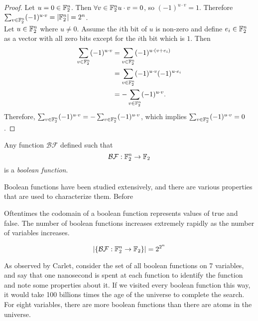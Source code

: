 \begin{proof}
	Let $u=0\in\mathbb{F}_2^n$. Then $\forall v\in\mathbb{F}_2^n u\cdot v=0$, so
	$(-1)^{u\cdot v}=1$. Therefore $\sum_{v\in\mathbb{F}_2^n}(-1)^{u\cdot v}=\lvert\mathbb{F}_2^n\rvert=2^n$. \\

	Let $u\in\mathbb{F}_2^n$ where $u\not=0$. Assume the $i$th bit of $u$ is non-zero and
	define $e_i\in\mathbb{F}_2^n$ as a vector with all zero bits except for the $i$th bit which is $1$. Then
	\begin{align*}
		\sum_{v\in\mathbb{F}_2^n}(-1)^{u\cdot v} &= \sum_{v\in\mathbb{F}_2^n}(-1)^{u\cdot (v+e_i)} \\
		                                   &= \sum_{v\in\mathbb{F}_2^n}(-1)^{u\cdot v}(-1)^{u\cdot e_i} \\
																			 &= -\sum_{v\in\mathbb{F}_2^n}(-1)^{u\cdot v}.
  \end{align*}
	Therefore, $\sum_{v\in\mathbb{F}_2^n}(-1)^{u\cdot v}=-\sum_{v\in\mathbb{F}_2^n}(-1)^{u\cdot v}$, which implies
	$\sum_{v\in\mathbb{F}_2^n}(-1)^{u\cdot v}=0$.
\end{proof}

\begin{definition}
\label{def:boolean-function}
  Any function $\mathcal{BF}$ defined such that 
  \begin{equation}
    \mathcal{BF}:\mathbb{F}_2^n\rightarrow\mathbb{F}_2
  \end{equation}
  is a {\em boolean function}.
\end{definition}

\par Boolean functions have been studied extensively, and there are various properties that
are used to characterize them. Before

\par Oftentimes the codomain of a boolean function represents values of true
and false. The number of boolean functions increases
extremely rapidly as the number of variables increases.

\begin{equation}
  \lvert\{\mathcal{BF}:\mathbb{F}_2^n\rightarrow\mathbb{F}_2\}\rvert = 2^{2^n}
\end{equation}

\par As observed by Carlet, consider the set of all boolean functions on 7 variables,
and say that one nanosecond is spent at each function to identify the function and
note some properties about it. If we visited every boolean function this way, it
would take 100 billions times the age of the universe to complete the search.
For eight variables, there are more boolean functions than there are atoms in the
universe.


